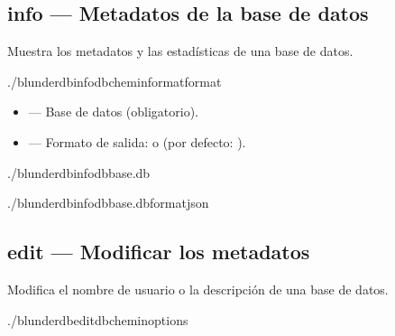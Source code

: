 \documentclass[letterpaper,10pt,spanish]{sphinxmanual}
\begin{document}
\subsection{info — Metadatos de la base de datos}
\label{\detokenize{cli:info-metadonnees-de-la-base}}
\sphinxAtStartPar
Muestra los metadatos y las estadísticas de una base de datos.

\begin{sphinxVerbatim}[commandchars=\\\{\}]
./blunderdbinfo\PYGZhy{}\PYGZhy{}db\PYGZlt{}chemin\PYGZgt{}\PYG{o}{[}\PYGZhy{}\PYGZhy{}format\PYGZlt{}format\PYGZgt{}\PYG{o}{]}
\end{sphinxVerbatim}

\sphinxAtStartPar
{}
\begin{itemize}
\item {} 
\sphinxAtStartPar
{} — Base de datos (obligatorio).

\item {} 
\sphinxAtStartPar
{} — Formato de salida:  o  (por defecto: ).

\end{itemize}

\sphinxAtStartPar
{}

\begin{sphinxVerbatim}[commandchars=\\\{\}]
./blunderdbinfo\PYGZhy{}\PYGZhy{}dbbase.db

./blunderdbinfo\PYGZhy{}\PYGZhy{}dbbase.db\PYGZhy{}\PYGZhy{}formatjson
\end{sphinxVerbatim}


\subsection{edit — Modificar los metadatos}
\label{\detokenize{cli:edit-modifier-les-metadonnees}}
\sphinxAtStartPar
Modifica el nombre de usuario o la descripción de una base de datos.

\begin{sphinxVerbatim}[commandchars=\\\{\}]
./blunderdbedit\PYGZhy{}\PYGZhy{}db\PYGZlt{}chemin\PYGZgt{}\PYG{o}{[}options\PYG{o}{]}
\end{sphinxVerbatim}
\end{document}
